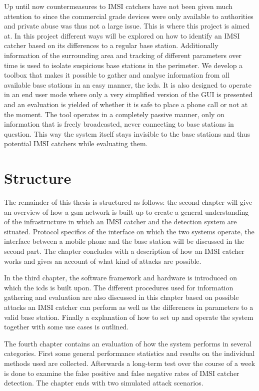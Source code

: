 Up until now countermeasures to IMSI catchers have not been given much attention to since the commercial grade devices were only available to authorities and private abuse was thus not a large issue.
This is where this project is aimed at.
In this project different ways will be explored on how to identify an IMSI catcher based on its differences to a regular base station.
Additionally information of the surrounding area and tracking of different parameters over time is used to isolate suspicious base stations in the perimeter.
We develop a toolbox that makes it possible to gather and analyse information from all available base stations in an easy manner, the \gls{icds}.
It is also designed to operate in an end user mode where only a very simplified version of the GUI is presented and an evaluation is yielded of whether it is safe to place a phone call or not at the moment.
The tool operates in a completely passive manner, only on information that is freely broadcasted, never connecting to base stations in question.
This way the system itself stays invisible to the base stations and thus potential IMSI catchers while evaluating them.

\section{Structure}
The remainder of this thesis is structured as follows: the second chapter will give an overview of how a \gls{gsm} network is built up to create a general understanding of the infrastructure in which an IMSI catcher and the detection system are situated.
Protocol specifics of the interface on which the two systems operate, the interface between a mobile phone and the base station will be discussed in the second part.
The chapter concludes with a description of how an IMSI catcher works and gives an account of what kind of attacks are possible.

In the third chapter, the software framework and hardware is introduced on which the \gls{icds} is built upon.
The different procedures used for information gathering and evaluation are also discussed in this chapter based on possible attacks an IMSI catcher can perform as well as the differences in parameters to a valid base station.
Finally a explanation of how to set up and operate the system together with some use cases is outlined.

The fourth chapter contains an evaluation of how the system performs in several categories.
First some general performance statistics and results on the individual methods used are collected.
Afterwards a long-term test over the course of a week is done to examine the false positive and false negative rates of IMSI catcher detection.
The chapter ends with two simulated attack scenarios.

